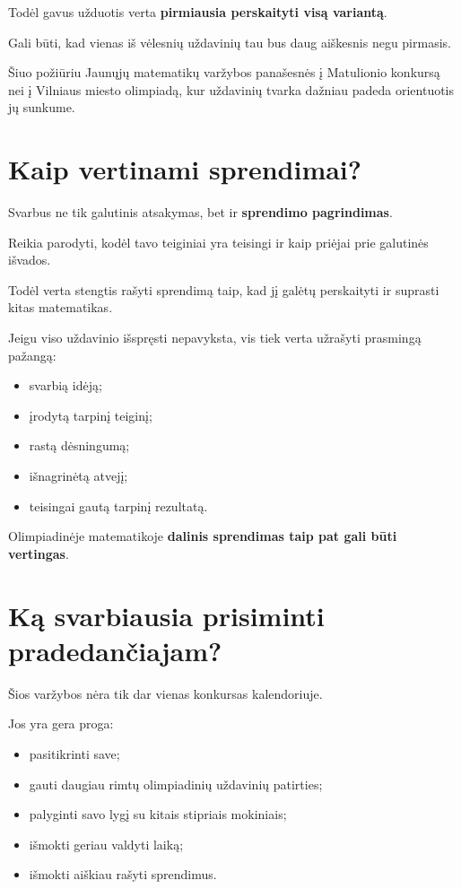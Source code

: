\documentclass[11pt,a4paper]{article}
\begin{document}
Todėl gavus užduotis verta \textbf{pirmiausia perskaityti visą variantą}.

Gali būti, kad vienas iš vėlesnių uždavinių tau bus daug aiškesnis negu pirmasis.

Šiuo požiūriu Jaunųjų matematikų varžybos panašesnės į Matulionio konkursą nei į Vilniaus miesto olimpiadą, kur uždavinių tvarka dažniau padeda orientuotis jų sunkume.

\section{Kaip vertinami sprendimai?}

Svarbus ne tik galutinis atsakymas, bet ir \textbf{sprendimo pagrindimas}.

Reikia parodyti, kodėl tavo teiginiai yra teisingi ir kaip priėjai prie galutinės išvados.

Todėl verta stengtis rašyti sprendimą taip, kad jį galėtų perskaityti ir suprasti kitas matematikas.

Jeigu viso uždavinio išspręsti nepavyksta, vis tiek verta užrašyti prasmingą pažangą:
\begin{itemize}
  \item svarbią idėją;
  \item įrodytą tarpinį teiginį;
  \item rastą dėsningumą;
  \item išnagrinėtą atvejį;
  \item teisingai gautą tarpinį rezultatą.
\end{itemize}

Olimpiadinėje matematikoje \textbf{dalinis sprendimas taip pat gali būti vertingas}.

\section{Ką svarbiausia prisiminti pradedančiajam?}

Šios varžybos nėra tik dar vienas konkursas kalendoriuje.

Jos yra gera proga:
\begin{itemize}
  \item pasitikrinti save;
  \item gauti daugiau rimtų olimpiadinių uždavinių patirties;
  \item palyginti savo lygį su kitais stipriais mokiniais;
  \item išmokti geriau valdyti laiką;
  \item išmokti aiškiau rašyti sprendimus.
\end{itemize}
\end{document}
